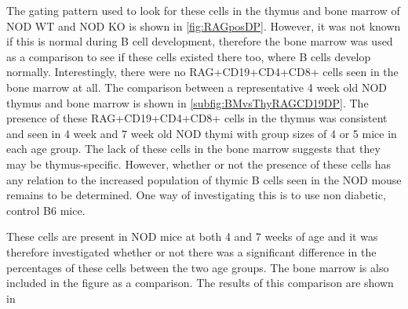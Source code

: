 The gating pattern used to look for these cells in the thymus and bone marrow of NOD WT and NOD KO is shown in \cref{fig:RAGposDP}.
However, it was not known if this is normal during B cell development, therefore the bone marrow was used as a comparison to see if these cells existed there too, where B cells develop normally.
Interestingly, there were no RAG+CD19+CD4+CD8+ cells seen in the bone marrow at all. 
The comparison between a representative 4 week old NOD thymus and bone marrow is shown in \cref{subfig:BMvsThyRAGCD19DP}.
The presence of these RAG+CD19+CD4+CD8+ cells in the thymus was consistent and seen in 4 week and 7 week old NOD thymi with group sizes of 4 or 5 mice in each age group. 
The lack of these cells in the bone marrow suggests that they may be thymus-specific.
However, whether or not the presence of these cells has any relation to the increased population of thymic B cells seen in the NOD mouse remains to be determined.
One way of investigating this is to use non diabetic, control B6 mice.


These cells are present in NOD mice at both 4 and 7 weeks of age and it was therefore investigated whether or not there was a significant difference in the percentages of these cells between the two age groups. 
The bone marrow is also included in the figure as a comparison.
The results of this comparison are shown in 


